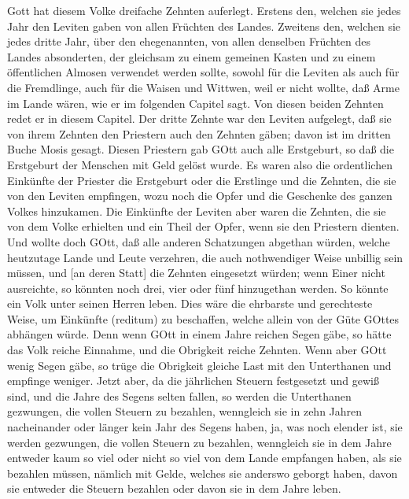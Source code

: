 Gott hat diesem Volke dreifache Zehnten auferlegt. Erstens den, welchen sie jedes Jahr den Leviten gaben von allen Früchten des Landes. Zweitens den, welchen sie jedes dritte Jahr, über
den ehegenannten, von allen denselben Früchten des Landes absonderten, der gleichsam zu einem gemeinen Kasten und zu einem öffentlichen Almosen verwendet werden sollte, sowohl für die Leviten als auch für die Fremdlinge, auch für die Waisen und Wittwen, weil er nicht wollte, daß Arme im Lande wären, wie er im folgenden Capitel sagt. Von diesen beiden Zehnten redet er in diesem Capitel. Der dritte Zehnte war den Leviten aufgelegt, daß sie von ihrem Zehnten den Priestern auch den Zehnten gäben; davon ist im dritten Buche Mosis gesagt. Diesen Priestern gab GOtt auch alle Erstgeburt, so daß die Erstgeburt der Menschen mit Geld gelöst wurde. Es waren also die ordentlichen Einkünfte der Priester die Erstgeburt oder die Erstlinge und die Zehnten, die sie von den Leviten empfingen, wozu noch die Opfer und die Geschenke des ganzen Volkes hinzukamen. Die Einkünfte der Leviten aber waren die Zehnten, die sie von dem Volke erhielten und ein Theil der Opfer, wenn sie den Priestern dienten. Und wollte doch GOtt, daß alle anderen Schatzungen abgethan würden, welche heutzutage Lande und Leute verzehren, die auch nothwendiger Weise unbillig sein müssen, und [an deren Statt] die Zehnten eingesetzt würden; wenn Einer nicht ausreichte, so könnten noch drei, vier oder fünf hinzugethan werden. So könnte ein Volk unter seinen Herren leben. Dies wäre die ehrbarste und gerechteste Weise, um Einkünfte (reditum) zu beschaffen, welche allein von der Güte GOttes abhängen würde. Denn wenn GOtt in einem Jahre reichen Segen gäbe, so hätte das Volk reiche Einnahme, und die Obrigkeit reiche Zehnten. Wenn aber GOtt wenig Segen gäbe, so trüge die Obrigkeit gleiche Last mit den Unterthanen und empfinge weniger. Jetzt aber, da die jährlichen Steuern festgesetzt und gewiß sind, und die Jahre des Segens selten fallen, so werden die Unterthanen gezwungen, die vollen Steuern zu bezahlen, wenngleich sie in zehn Jahren nacheinander oder länger kein Jahr des Segens haben, ja, was noch elender ist, sie werden gezwungen, die vollen Steuern zu bezahlen, wenngleich sie in dem Jahre entweder kaum so viel oder nicht so viel von dem Lande empfangen haben, als sie bezahlen müssen, nämlich mit Gelde, welches sie anderswo geborgt haben, davon sie entweder die Steuern bezahlen oder davon sie in dem Jahre leben.

